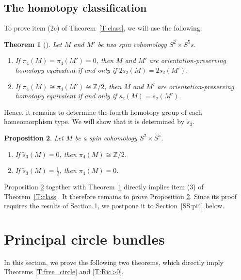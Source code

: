 \documentclass[pdftex]{sigma}
\numberwithin{equation}{section}
\newtheorem{Theorem}{Theorem}[section]
\newtheorem{Proposition}[Theorem]{Proposition}
\theoremstyle{definition}
\numberwithin{table}{section}
\newcommand{\Z}{\mathbb{Z}}
\begin{document}
\subsection{The homotopy classification}

To prove item (2c) of Theorem~\ref{T:class}, we will use the following:
\begin{Theorem}[{\cite[Theorem 0.1]{Kr98}}]\label{T:hom_class}
	Let $M$ and $M'$ be two spin cohomology $S^2\times S^5$s.
	\begin{enumerate}\itemsep=0pt
		\item[$(1)$] If $\pi_4(M)=\pi_4(M')=0$, then $M$ and $M'$ are orientation-preserving homotopy equivalent if and only if $2s_2(M)=2s_2(M')$.
		\item[$(2)$] If $\pi_4(M)\cong\pi_4(M')\cong\Z/2$, then $M$ and $M'$ are orientation-preserving homotopy equivalent if and only if $s_2(M)=s_2(M')$.
	\end{enumerate}
\end{Theorem}
Hence, it remains to determine the fourth homotopy group of each homeomorphism type. We will show that it is determined by $\tilde{s}_3$.
\begin{Proposition}\label{P:pi4}
	Let $M$ be a spin cohomology $S^2\times S^5$.
	\begin{enumerate}\itemsep=0pt
		\item[$(1)$] If $\tilde{s}_3(M)=0$, then $\pi_4(M)\cong\Z/2$.
		\item[$(2)$] If $\tilde{s}_3(M)=\frac{1}{2}$, then $\pi_4(M)=0$.
	\end{enumerate}
\end{Proposition}
Proposition \ref{P:pi4} together with Theorem~\ref{T:hom_class} directly implies item (3) of Theorem~\ref{T:class}. It therefore remains to prove Proposition \ref{P:pi4}. Since its proof requires the results of Section \ref{S:circ_bund}, we postpone it to Section~\ref{SS:pi4} below.

\section{Principal circle bundles}\label{S:circ_bund}

In this section, we prove the following two theorems, which directly imply Theorems \ref{T:free_circle} and \ref{T:Ric>0}.
\end{document}
